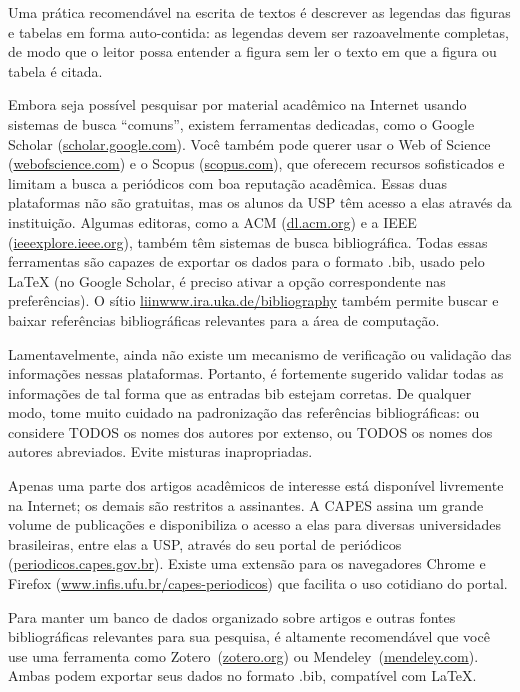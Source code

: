 Uma prática recomendável na escrita de textos é descrever as
legendas das figuras e tabelas em forma auto-contida: as
legendas devem ser razoavelmente completas, de modo que o leitor possa entender
a figura sem ler o texto em que a figura ou tabela é citada.


Embora seja possível pesquisar por material acadêmico na Internet usando
sistemas de busca ``comuns'', existem ferramentas dedicadas, como o
\textsf{Google Scholar} (\url{scholar.google.com}).
Você também pode querer usar o \textsf{Web of Science}
(\url{webofscience.com}) e o \textsf{Scopus} (\url{scopus.com}),
que oferecem recursos sofisticados e limitam a busca a periódicos com boa
reputação acadêmica. Essas duas plataformas não são gratuitas, mas os alunos
da USP têm acesso a elas através da instituição. Algumas editoras, como a
ACM (\url{dl.acm.org}) e a IEEE (\url{ieeexplore.ieee.org}), também têm
sistemas de busca bibliográfica. Todas essas ferramentas são capazes de
exportar os dados para o formato .bib, usado pelo \LaTeX{} (no Google
Scholar, é preciso ativar a opção correspondente nas preferências). O sítio
\url{liinwww.ira.uka.de/bibliography} também permite buscar e baixar
referências bibliográficas relevantes para a área de computação.

Lamentavelmente, ainda não existe um mecanismo de verificação ou validação
das informações nessas plataformas. Portanto, é fortemente sugerido validar
todas as informações de tal forma que as entradas bib estejam corretas.
De qualquer modo, tome muito cuidado na padronização das referências
bibliográficas: ou considere TODOS os nomes dos autores por extenso, ou
TODOS os nomes dos autores abreviados. Evite misturas inapropriadas.

Apenas uma parte dos artigos acadêmicos de interesse está disponível livremente
na Internet; os demais são restritos a assinantes. A CAPES assina um grande
volume de publicações e disponibiliza o acesso a elas para diversas universidades
brasileiras, entre elas a USP, através do seu portal de periódicos
(\url{periodicos.capes.gov.br}). Existe uma extensão para os navegadores
Chrome e Firefox (\url{www.infis.ufu.br/capes-periodicos}) que facilita o uso
cotidiano do portal.

Para manter um banco de dados organizado sobre artigos e outras fontes bibliográficas
relevantes para sua pesquisa, é altamente recomendável que você use uma ferramenta
como Zotero~(\url{zotero.org}) ou
Mendeley~(\url{mendeley.com}). Ambas podem exportar seus dados no
formato .bib, compatível com \LaTeX{}.
